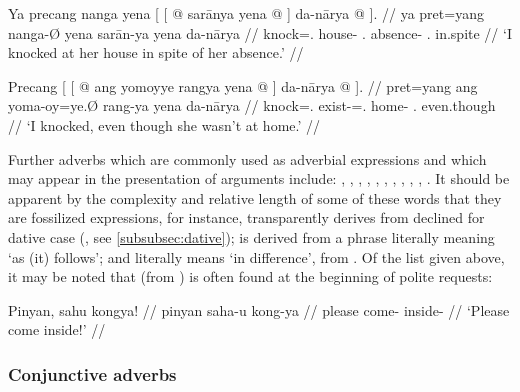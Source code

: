\pex\label{ex:danaarya}
\a\label{ex:danaarya1}\begingl
	\gla Ya precang nanga yena {\normalfont[ [} @ sarānya 
		yena @ {\normalfont]} da-nārya @ {\normalfont]}. //
	\glb ya pret=yang nanga-Ø yena {} sarān-ya yena {} da-nārya {} //
	\glc \LocT{} knock=\Fsg{}.\Aarg{} house-\Top{} \TsgF{}.\Gen{} {}
		absence-\Loc{} \TsgF{}.\Gen{} {} in.spite {} //
	\glft `I knocked at her house in spite of her absence.' //
\endgl

\a\label{ex:danaarya2}\begingl
	\gla Precang {\normalfont[ [} @ ang yomoyye rangya 
		yena @ {\normalfont]} da-nārya @ {\normalfont]}. //
	\glb pret=yang {} ang yoma-oy=ye.Ø rang-ya yena {} da-nārya {} //
	\glc knock=\Fsg{}.\Aarg{} {} \AgtT{} exist-\Neg{}=\TsgF{}.\Top{} 
		home-\Loc{} \TsgF{}.\Gen{} {} even.though {} //
	\glft `I knocked, even though she wasn't at home.' //
\endgl

\xe

Further adverbs which are commonly used as adverbial expressions and which may 
appear in the presentation of arguments include:
,
,
,
,
,
,
,
,
,
,
.
It should be apparent by the complexity and relative length of some of these 
words that they are fossilized expressions, for instance, 
 transparently derives from 
 declined for dative case 
(, see \autoref{subsubsec:dative}); 
 is derived from a phrase literally meaning `as 
(it) follows'; and  literally 
means `in difference', from . Of the list given above, it may be noted that 
 (from ) is often found 
at the beginning of polite requests:

\ex
\begingl
	\gla Pinyan, sahu kongya! //
	\glb pinyan saha-u kong-ya //
	\glc please come-\Imp{} inside-\Loc{} //
	\glft `Please come inside!' //
\endgl
\xe

\subsubsection{Conjunctive adverbs}
\label{subsubsec:conjadv}

